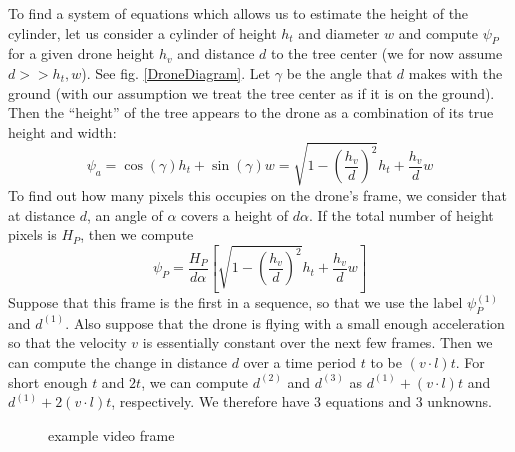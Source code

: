 \documentclass[10pt,a4paper]{article}
\begin{document}
To find a system of equations which allows us to estimate the height of the cylinder, let us consider a cylinder of height $h_t$ and diameter $w$ and compute $\psi_P$ for a given drone height $h_v$ and distance $d$ to the tree center (we for now assume $d >> h_t, w$). See fig. \ref{DroneDiagram}. Let $\gamma$ be the angle that $d$ makes with the ground (with our assumption we treat the tree center as if it is on the ground). Then the ``height'' of the tree appears to the drone as a combination of its true height and width: 
\begin{equation}
\psi_a = \cos(\gamma)h_t + \sin(\gamma)w = \sqrt{1-\left(\frac{h_v}{d}\right)^2}h_t + \frac{h_v}{d}w
\end{equation} 
To find out how many pixels this occupies on the drone's frame, we consider that at distance $d$, an angle of $\alpha$ covers a height of $d\alpha$. If the total number of height pixels is $H_P$, then we compute
\begin{equation}
\psi_P =\frac{H_P}{d\alpha}\left[\sqrt{1-\left(\frac{h_v}{d}\right)^2}h_t + \frac{h_v}{d}w\right]
\end{equation}
  Suppose that this frame is the first in a sequence, so that we use the label $\psi^{(1)}_P$ and $d^{(1)}$. Also suppose that the drone is flying with a small enough acceleration so that the velocity $v$ is essentially constant over the next few frames. Then we can compute the change in distance $d$ over a time period $t$ to be $(v\cdot l)t$. For short enough $t$ and $2t$, we can compute $d^{(2)}$ and $d^{(3)}$ as $d^{(1)} + (v\cdot l)t$ and $d^{(1)} + 2(v\cdot l)t$, respectively. We therefore have 3 equations and 3 unknowns.
\begin{figure}\label{DroneImage}
\centering
{}
\caption{example video frame}
\end{figure}
\end{document}
